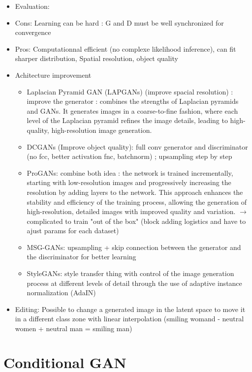 \documentclass{article}
\theoremstyle{plain}%
\theoremstyle{definition}
\theoremstyle{remark}
\begin{document}
\begin{itemize}
\begin{itemize}
    \end{itemize}
    \item Evaluation:
    \item Cons: Learning can be hard : G and D must be well synchronized for convergence
    \item Pros: Computationnal efficient (no complexe likelihood inference), can fit sharper distribution, Spatial resolution, object quality
    \item Achitecture improvement  \begin{itemize}
        \item Laplacian Pyramid GAN (LAPGANs) (improve spacial resolution) : improve the generator : combines the strengths of Laplacian pyramids and GANs. It generates images in a coarse-to-fine fashion, where each level of the Laplacian pyramid refines the image details, leading to high-quality, high-resolution image generation.
        \item DCGANs (Improve object quality): full conv generator and discriminator (no fcc, better activation fnc, batchnorm) ; upsampling step by step
        \item ProGANs: combine both idea : the network is trained incrementally, starting with low-resolution images and progressively increasing the resolution by adding layers to the network. This approach enhances the stability and efficiency of the training process, allowing the generation of high-resolution, detailed images with improved quality and variation. $\rightarrow$ complicated to train "out of the box" (block adding logistics and have to ajust params for each dataset)
        \item MSG-GANs: upsampling + skip connection between the generator and the discriminator for better learning
        \item StyleGANs: style transfer thing with control of the image generation process at different levels of detail through the use of adaptive instance normalization (AdaIN)
    \end{itemize}
    \item Editing: Possible to change a generated image in the latent space to move it in a different class zone with linear interpolation (smiling womand - neutral women + neutral man = smiling man)
\end{itemize}

\section{Conditional GAN}
\end{document}
